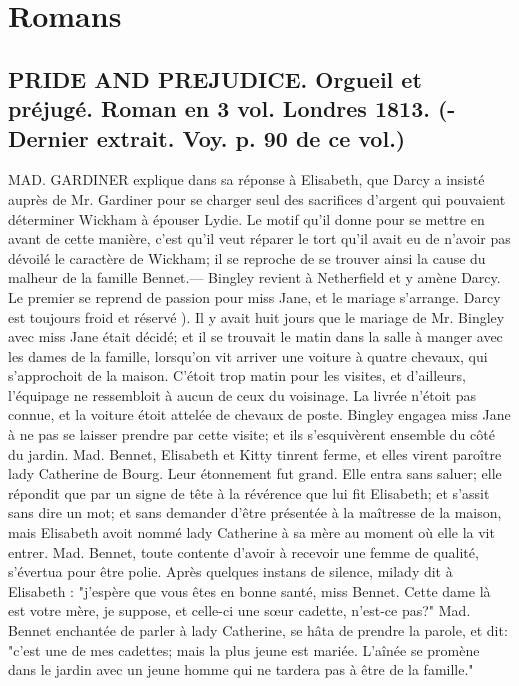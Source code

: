 \setcounter{page}{249}
\chapter{Romans}
\section{PRIDE AND PREJUDICE. Orgueil et préjugé. Roman en 3 vol. Londres 1813. \large{(-Dernier extrait. Voy. p. 90 de ce vol.)}}
MAD. GARDINER explique dans sa réponse à Elisabeth, que Darcy a insisté auprès de Mr. Gardiner pour se charger seul des sacrifices d'argent qui pouvaient déterminer Wickham à épouser Lydie. Le motif qu'il donne pour se mettre en avant de cette manière, c'est qu'il veut réparer le tort qu'il avait eu de n'avoir pas dévoilé le caractère de Wickham; il se reproche de se trouver ainsi la cause du malheur de la famille Bennet.— Bingley revient à Netherfield et y amène Darcy. Le premier se reprend de passion pour miss Jane, et le mariage s'arrange. Darcy est toujours froid et réservé ).
Il y avait huit jours que le mariage de Mr. Bingley avec miss Jane était décidé; et il se trouvait le matin dans la salle à manger avec les dames de la famille, lorsqu'on vit arriver une voiture à quatre chevaux,\setcounter{page}{250} qui s'approchoit de la maison. C'étoit trop matin pour les visites, et d'ailleurs, l'équipage ne ressembloit à aucun de ceux du voisinage. La livrée n'étoit pas connue, et la voiture étoit attelée de chevaux de poste. Bingley engagea miss Jane à ne pas se laisser prendre par cette visite; et ils s'esquivèrent ensemble du côté du jardin. Mad. Bennet, Elisabeth et Kitty tinrent ferme, et elles virent paroître lady Catherine de Bourg. Leur étonnement fut grand. Elle entra sans saluer; elle répondit que par un signe de tête à la révérence que lui fit Elisabeth; et s'assit sans dire un mot; et sans demander d'être présentée à la maîtresse de la maison, mais Elisabeth avoit nommé lady Catherine à sa mère au moment où elle la vit entrer.
Mad. Bennet, toute contente d'avoir à recevoir une femme de qualité, s'évertua pour être polie. Après quelques instans de silence, milady dit à Elisabeth : "j'espère que vous êtes en bonne santé, miss Bennet. Cette dame là est votre mère, je suppose, et celle-ci une sœur cadette, n'est-ce pas?"
Mad. Bennet enchantée de parler à lady Catherine, se hâta de prendre la parole, et dit: "c'est une de mes cadettes; mais la plus jeune est mariée. L'aînée se promène dans le jardin avec un jeune homme qui ne tardera pas à être de la famille."
\setcounter{page}{251}
